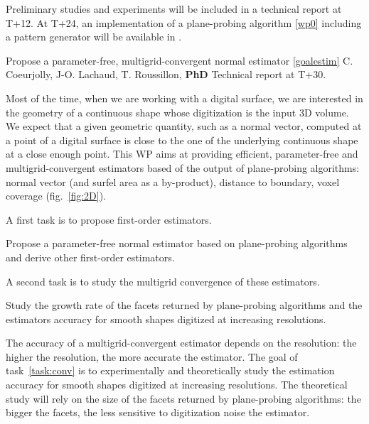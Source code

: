 Preliminary studies and experiments will be included in a technical report at T+12.
At T+24, an implementation of a plane-probing algorithm \ref{wp0} including a pattern
generator will be available in \DGtal. 




\medskip
{}
   {Propose a parameter-free, multigrid-convergent normal estimator \ref{goalestim}}
   {C. Coeurjolly, J-O. Lachaud, T. Roussillon, \textbf{PhD}}
   {Technical report at T+30.}
\medskip

Most of the time, when we are working with a digital surface, we are 
interested in the geometry of a continuous shape whose digitization is the input 3D volume.
We expect that a given geometric quantity, such as a normal vector, computed at a point of a digital surface
is close to the one of the underlying continuous shape at a close enough point. 
This WP aims at providing efficient, parameter-free and multigrid-convergent estimators based of
the output of plane-probing algorithms: normal vector (and surfel area as a by-product),
distance to boundary, voxel coverage (fig.~\ref{fig:2D}).

A first task is to propose first-order estimators. 
%
\begin{Task}
  \label{task:normal}
  Propose a parameter-free normal estimator based on plane-probing algorithms and
  derive other first-order estimators.  
\end{Task}

A second task is to study the multigrid convergence of these estimators. 
%
\begin{Task}
  \label{task:conv}
  Study the growth rate of the facets returned by plane-probing algorithms
  and the estimators accuracy for smooth shapes digitized at increasing resolutions. 
\end{Task}

The accuracy of a multigrid-convergent estimator depends on the resolution: the higher the resolution,
the more accurate the estimator. The goal of task~\ref{task:conv} is to experimentally and theoretically
study the estimation accuracy for smooth shapes digitized at increasing resolutions. The theoretical study
will rely on the size of the facets returned by plane-probing algorithms: the bigger the facets,
the less sensitive to digitization noise the estimator. 

